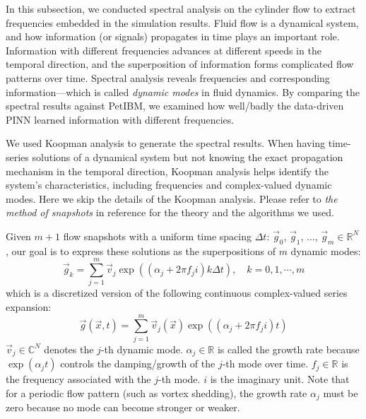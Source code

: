 
In this subsection, we conducted spectral analysis on the cylinder flow to extract frequencies embedded in the simulation results.
Fluid flow is a dynamical system, and how information (or signals) propagates in time plays an important role.
Information with different frequencies advances at different speeds in the temporal direction, and the superposition of information forms complicated flow patterns over time.
Spectral analysis reveals frequencies and corresponding information---which is called {\it dynamic modes} in fluid dynamics.
By comparing the spectral results against PetIBM, we examined how well/badly the data-driven PINN learned information with different frequencies.

We used Koopman analysis \cite{chen_variants_2012,rowley_spectral_2009} to generate the spectral results.
When having time-series solutions of a dynamical system but not knowing the exact propagation mechanism in the temporal direction, Koopman analysis helps identify the system's characteristics, including frequencies and complex-valued dynamic modes.
Here we skip the details of the Koopman analysis.
Please refer to {\it the method of snapshots} in reference \cite{chen_variants_2012} for the theory and the algorithms we used.

Given $m+1$ flow snapshots with a uniform time spacing $\Delta t$: $\vec{g}_0$, $\vec{g}_1$, $\dots$, $\vec{g}_m \in \mathbb{R}^{N}$, our goal is to express these solutions as the superpositions of $m$ dynamic modes:
\begin{equation}\label{eq:discrete-dmd}
    \vec{g}_k
    =
    \sum\limits_{j=1}^{m}
    \vec{v}_j
    \exp\left(\left( \alpha_j + 2 \pi f_j i\right) k \Delta t\right)
    ,\quad
    k = 0, 1, \cdots, m
\end{equation}
which is a discretized version of the following continuous complex-valued series expansion:
\begin{equation}\label{eq:continuous-dmd}
    \vec{g}(\vec{x}, t)
    =
    \sum\limits_{j=1}^{m}
    \vec{v}_j(\vec{x})
    \exp\left(\left( \alpha_j + 2\pi f_j i\right) t\right)
\end{equation}
$\vec{v}_j \in \mathbb{C}^{N}$ denotes the $j$-th dynamic mode.
$\alpha_j \in \mathbb{R}$ is called the growth rate because $\exp\left(\alpha_j t\right)$ controls the damping/growth of the $j$-th mode over time.
$f_j \in \mathbb{R}$ is the frequency associated with the $j$-th mode. 
$i$ is the imaginary unit.
Note that for a periodic flow pattern (such as vortex shedding), the growth rate $\alpha_j$ must be zero because no mode can become stronger or weaker.

